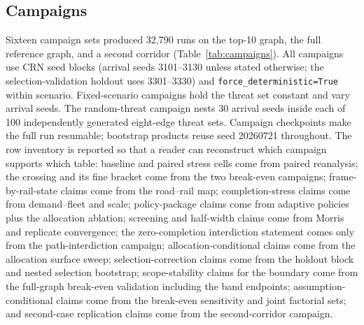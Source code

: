 \documentclass{ieeeaccess}
\begin{document}
\subsection{Campaigns}
Sixteen campaign sets produced 32{,}790 runs on the top-10 graph, the full reference graph, and a second corridor (Table~\ref{tab:campaigns}). All campaigns use CRN seed blocks (arrival seeds 3101--3130 unless stated otherwise; the selection-validation holdout uses 3301--3330) and \texttt{force\_\allowbreak deterministic\allowbreak=True} within scenario. Fixed-scenario campaigns hold the threat set constant and vary arrival seeds. The random-threat campaign nests 30 arrival seeds inside each of 100 independently generated eight-edge threat sets. Campaign checkpoints make the full run resumable; bootstrap products reuse seed 20260721 throughout. The row inventory is reported so that a reader can reconstruct which campaign supports which table: baseline and paired stress cells come from paired reanalysis; the crossing and its fine bracket come from the two break-even campaigns; frame-by-rail-state claims come from the road--rail map; completion-stress claims come from demand--fleet and scale; policy-package claims come from adaptive policies plus the allocation ablation; screening and half-width claims come from Morris and replicate convergence; the zero-completion interdiction statement comes only from the path-interdiction campaign; allocation-conditional claims come from the allocation surface sweep; selection-correction claims come from the holdout block and nested selection bootstrap; scope-stability claims for the boundary come from the full-graph break-even validation including the band endpoints; assumption-conditional claims come from the break-even sensitivity and joint factorial sets; and second-case replication claims come from the second-corridor campaign.
\end{document}
